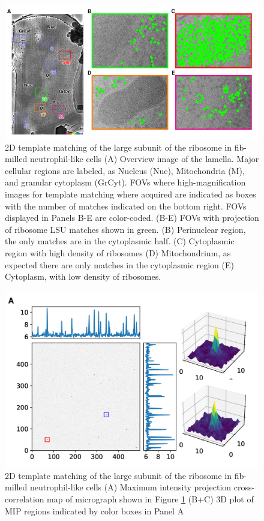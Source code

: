 \documentclass[
]{article}
\newenvironment{fignos:tagged-figure}[1][]{
    \let\oldthefigure\thefigure
    \let\oldtheHfigure\theHfigure
    \renewcommand{\thefigure}{#1}
    \renewcommand{\theHfigure}{#1}
  }{
    \let\thefigure\oldthefigure
    \let\theHfigure\oldtheHfigure
    \addtocounter{figure}{-1}
  }
\begin{document}
\begin{figure}
\hypertarget{fig:initmatching}{%
\centering
\includegraphics{figures/initmatching.png}
\caption{2D template matching of the large subunit of the ribosome in fib-milled neutrophil-like cells
(A) Overview image of the lamella. Major cellular regions are labeled, as Nucleus (Nuc), Mitochondria (M), and granular cytoplasm (GrCyt). FOVs where high-magnification images for template matching where acquired are indicated as boxes with the number of matches indicated on the bottom right. FOVs displayed in Panels B-E are color-coded.
(B-E) FOVs with projection of ribosome LSU matches shown in green. (B) Perinuclear region, the only matches are in the cytoplasmic half. (C) Cytoplasmic region with high density of ribosomes (D) Mitochondrium, as expected there are only matches in the cytoplasmic region (E) Cytoplasm, with low density of ribosomes.}\label{fig:initmatching}
}
\end{figure}

\begin{fignos:tagged-figure}[S1]

\begin{figure}
\hypertarget{fig:initmatching2}{%
\centering
\includegraphics{figures/initmatching2.png}
\caption{2D template matching of the large subunit of the ribosome in fib-milled
neutrophil-like cells (A) Maximum intensity projection cross-correlation map of
micrograph shown in Figure
\ref{fig:initmatching} (B+C) 3D plot of MIP regions indicated by color boxes in Panel A}\label{fig:initmatching2}
}
\end{figure}

\end{fignos:tagged-figure}
\end{document}
